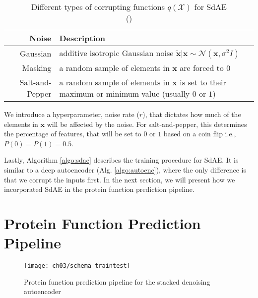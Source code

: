 \begin{table}[!h]
  \centering
  \caption[Different types of corrupting functions $q(\mathcal{X})$ for SdAE]
  {Different types of corrupting functions $q(\mathcal{X})$ for SdAE\\
  (\cite{vincent2010stacked})}
  \label{exp:noise_types}
  \begin{tabular}{@{}rp{}@{}}
      \toprule
      Noise            & Description                                                   \\ \midrule
      Gaussian         & additive isotropic Gaussian noise $\mathbf{\widetilde{x}} |
                         \mathbf{x} \sim \mathcal{N}(\mathbf{x}, \sigma^2 I)$          \\
      Masking          & a random sample of elements in $\mathbf{x}$ are forced to $0$ \\
      Salt-and-Pepper  & a random sample of elements in $\mathbf{x}$ is set to their
                         maximum or minimum value (usually $0$ or $1$)                 \\\bottomrule
  \end{tabular}
\end{table}

\par We introduce a hyperparameter, noise rate ($r$), that dictates how much of
the elements in $\mathbf{x}$ will be affected by the noise. For
salt-and-pepper, this determines the percentage of features, that will be set
to $0$ or $1$ based on a coin flip i.e., $P(0) = P(1) = 0.5$.


\par Lastly, Algorithm \ref{algo:sdae} describes the training procedure for SdAE.
It is similar to a deep autoencoder (Alg. \ref{algo:autoenc}), where the only difference
is that we corrupt the inputs first. In the next section, we will present how
we incorporated SdAE in the protein function prediction pipeline.



\section{Protein Function Prediction Pipeline}
\label{SDPipeline}

\begin{figure}[!t]
  \centering
  \texttt{[image: ch03/schema\_traintest]}
  \caption[Protein function prediction pipeline]{Protein function prediction
  pipeline for the stacked denoising autoencoder}
  \label{schema:traintest_sdae}
\end{figure}

